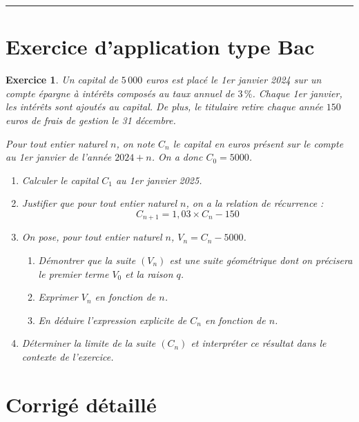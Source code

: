 \documentclass[11pt,a4paper]{article}
\newtheorem{exercice}{Exercice}
\begin{document}
\vspace{0.5cm}
\hrule
\vspace{0.5cm}

\section{Exercice d'application type Bac}

\begin{exercice}
Un capital de $5\,000$ euros est placé le 1er janvier 2024 sur un compte épargne à intérêts composés au taux annuel de $3\,\%$. Chaque 1er janvier, les intérêts sont ajoutés au capital. 
De plus, le titulaire retire chaque année $150$ euros de frais de gestion le 31 décembre.

Pour tout entier naturel $n$, on note $C_n$ le capital en euros présent sur le compte au 1er janvier de l'année $2024 + n$. On a donc $C_0 = 5000$.

\begin{enumerate}
    \item Calculer le capital $C_1$ au 1er janvier 2025.
    \item Justifier que pour tout entier naturel $n$, on a la relation de récurrence :
    \[C_{n+1} = 1{,}03 \times C_n - 150\]
    \item On pose, pour tout entier naturel $n$, $V_n = C_n - 5000$.
    \begin{enumerate}
        \item Démontrer que la suite $(V_n)$ est une suite géométrique dont on précisera le premier terme $V_0$ et la raison $q$.
        \item Exprimer $V_n$ en fonction de $n$.
        \item En déduire l'expression explicite de $C_n$ en fonction de $n$.
    \end{enumerate}
    \item Déterminer la limite de la suite $(C_n)$ et interpréter ce résultat dans le contexte de l'exercice.
\end{enumerate}
\end{exercice}

\newpage

\section{Corrigé détaillé}
\end{document}
